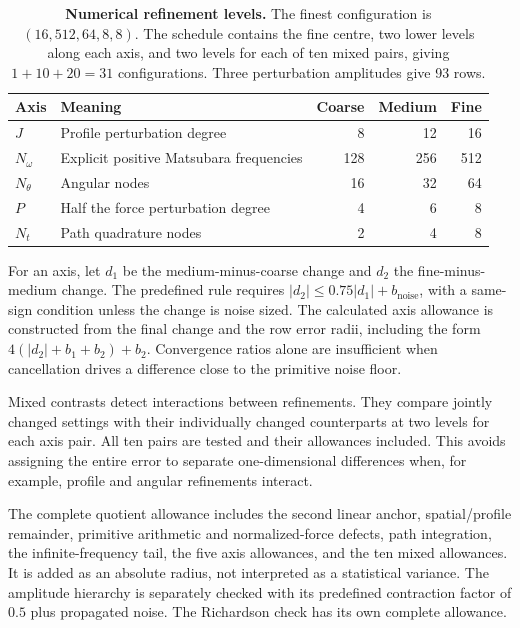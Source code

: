 \begin{table}[tbp]\centering
\caption{\textbf{Numerical refinement levels.} The finest configuration is $(16,512,64,8,8)$. The schedule contains the fine centre, two lower levels along each axis, and two levels for each of ten mixed pairs, giving $1+10+20=31$ configurations. Three perturbation amplitudes give 93 rows.}\label{tab:levels}
\begin{tabular}{llrrr}\toprule
Axis & Meaning & Coarse & Medium & Fine\\\midrule
$J$ & Profile perturbation degree &8&12&16\\
$N_\omega$ & Explicit positive Matsubara frequencies &128&256&512\\
$N_\theta$ & Angular nodes &16&32&64\\
$P$ & Half the force perturbation degree &4&6&8\\
$N_t$ & Path quadrature nodes &2&4&8\\\bottomrule
\end{tabular}
\end{table}

For an axis, let $d_1$ be the medium-minus-coarse change and $d_2$ the fine-minus-medium change. The predefined rule requires $|d_2|\le0.75|d_1|+b_{\mathrm{noise}}$, with a same-sign condition unless the change is noise sized. The calculated axis allowance is constructed from the final change and the row error radii, including the form $4(|d_2|+b_1+b_2)+b_2$. Convergence ratios alone are insufficient when cancellation drives a difference close to the primitive noise floor.

Mixed contrasts detect interactions between refinements. They compare jointly changed settings with their individually changed counterparts at two levels for each axis pair. All ten pairs are tested and their allowances included. This avoids assigning the entire error to separate one-dimensional differences when, for example, profile and angular refinements interact.

The complete quotient allowance includes the second linear anchor, spatial/profile remainder, primitive arithmetic and normalized-force defects, path integration, the infinite-frequency tail, the five axis allowances, and the ten mixed allowances. It is added as an absolute radius, not interpreted as a statistical variance. The amplitude hierarchy is separately checked with its predefined contraction factor of $0.5$ plus propagated noise. The Richardson check has its own complete allowance.

